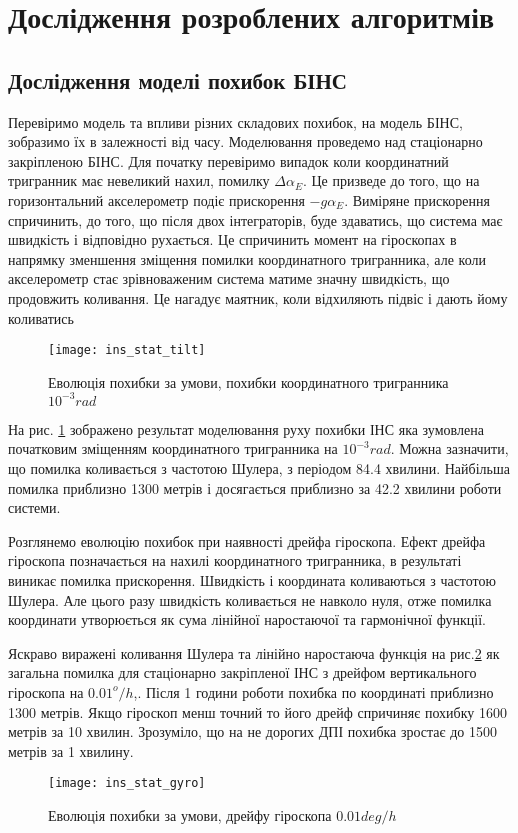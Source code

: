 \section{Дослідження розроблених алгоритмів}

\subsection{Дослідження моделі похибок БІНС}

Перевіримо модель та впливи різних складових похибок, на модель БІНС, зобразимо їх в
залежності від часу. Моделювання проведемо над стаціонарно закріпленою БІНС.
Для початку перевіримо випадок коли координатний тригранник має невеликий нахил,
помилку $\Delta \alpha_{E}$. Це призведе до того, що на горизонтальний акселерометр
подіє прискорення $-g \alpha_{E}$. Виміряне прискорення спричинить, до того, що після
двох інтеграторів, буде здаватись, що система має швидкість і відповідно рухається.
Це спричинить момент на гіроскопах в напрямку зменшення зміщення помилки
координатного тригранника, але коли акселерометр стає зрівноваженим система 
матиме значну швидкість, що продовжить коливання. Це нагадує маятник, коли відхиляють
підвіс і дають йому коливатись

\begin{figure}[here]
\centering
\texttt{[image: ins\_stat\_tilt]}
\caption{Еволюція похибки за умови, похибки координатного тригранника $10^{-3} rad$}
\label{fig:ins_stat_tilt}
\end{figure}

На рис. \ref{fig:ins_stat_tilt} зображено результат моделювання руху похибки ІНС
яка зумовлена початковим зміщенням координатного тригранника на $10^{-3} rad$.
Можна зазначити, що помилка коливається з частотою Шулера, з періодом 84.4 хвилини.
Найбільша помилка приблизно 1300 метрів і досягається приблизно за 42.2 хвилини роботи системи.

Розглянемо еволюцію похибок при наявності дрейфа гіроскопа. Ефект дрейфа гіроскопа позначається на нахилі координатного тригранника, в результаті виникає помилка прискорення. Швидкість і координата коливаються з частотою Шулера. Але цього разу швидкість
коливається не навколо нуля, отже помилка координати утворюється як сума лінійної наростаючої та гармонічної функції.

 Яскраво виражені коливання Шулера та лінійно наростаюча функція на рис.\ref{fig:ins_stat_gyro} як загальна помилка для стаціонарно закріпленої ІНС з дрейфом вертикального гіроскопа на $0.01^{o}/h$,. Після 1 години роботи похибка по координаті приблизно 1300 метрів. Якщо гіроскоп менш точний то його дрейф спричиняє похибку 1600 метрів за 10 хвилин. Зрозуміло, що на не дорогих ДПІ похибка зростає до 1500 метрів за 1 хвилину.
\begin{figure}[here]
\centering
\texttt{[image: ins\_stat\_gyro]}
\caption{Еволюція похибки за умови, дрейфу гіроскопа $0.01 deg/h$}
\label{fig:ins_stat_gyro}
\end{figure}

